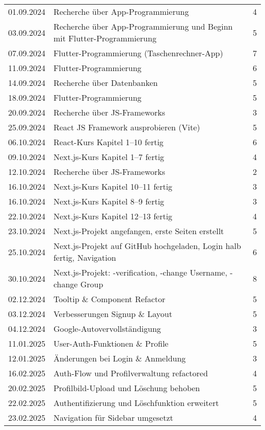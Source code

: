 \begin{longtable}{|l|p{9cm}|c|}
    01.09.2024 & Recherche über App-Programmierung & 4 \\
    03.09.2024 & Recherche über App-Programmierung und Beginn mit Flutter-Programmierung & 5 \\
    07.09.2024 & Flutter-Programmierung (Taschenrechner-App) & 7 \\
    11.09.2024 & Flutter-Programmierung & 6 \\
    14.09.2024 & Recherche über Datenbanken & 5 \\
    18.09.2024 & Flutter-Programmierung & 5 \\
    20.09.2024 & Recherche über JS-Frameworks & 3 \\
    25.09.2024 & React JS Framework ausprobieren (Vite) & 5 \\
    06.10.2024 & React-Kurs Kapitel 1--10 fertig & 6 \\
    09.10.2024 & Next.js-Kurs Kapitel 1--7 fertig & 4 \\
    12.10.2024 & Recherche über JS-Frameworks & 2 \\
    16.10.2024 & Next.js-Kurs Kapitel 10--11 fertig & 3 \\
    16.10.2024 & Next.js-Kurs Kapitel 8--9 fertig & 3 \\
    22.10.2024 & Next.js-Kurs Kapitel 12--13 fertig & 4 \\
    23.10.2024 & Next.js-Projekt angefangen, erste Seiten erstellt & 5 \\
    25.10.2024 & Next.js-Projekt auf GitHub hochgeladen, Login halb fertig, Navigation & 6 \\
    30.10.2024 & Next.js-Projekt: -verification, -change Username, -change Group & 8 \\
    02.12.2024 & Tooltip \& Component Refactor & 5 \\
    03.12.2024 & Verbesserungen Signup \& Layout & 5 \\
    04.12.2024 & Google-Autovervollständigung & 3 \\
    11.01.2025 & User-Auth-Funktionen \& Profile & 5 \\
    12.01.2025 & Änderungen bei Login \& Anmeldung & 3 \\
    16.02.2025 & Auth-Flow und Profilverwaltung refactored & 4 \\
    20.02.2025 & Profilbild-Upload und Löschung behoben & 5 \\
    22.02.2025 & Authentifizierung und Löschfunktion erweitert & 5 \\
    23.02.2025 & Navigation für Sidebar umgesetzt & 4 \\

\end{longtable}
